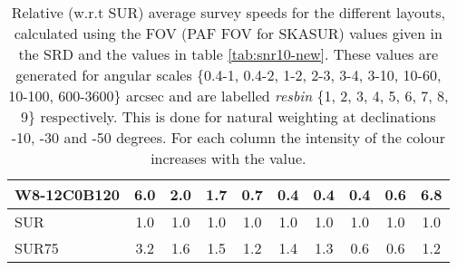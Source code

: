 \begin{table}[!htp]
{{\begin{tabular}{|l|ccccccccc|}
W8-12C0B120 & 6.0 \cellcolor{blue!60.00} & 2.0 \cellcolor{red!60.00} & 1.7 \cellcolor{green!60.00} & 0.7 \cellcolor{orange!29.20} & 0.4 \cellcolor{purple!18.00} & 0.4 \cellcolor{blue!18.93} & 0.4 \cellcolor{red!20.47} & 0.6 \cellcolor{green!21.00} & 6.8 \cellcolor{orange!58.31}\\ \hline 
SUR & 1.0 \cellcolor{blue!18.00} & 1.0 \cellcolor{red!18.00} & 1.0 \cellcolor{green!27.13} & 1.0 \cellcolor{orange!47.40} & 1.0 \cellcolor{purple!44.25} & 1.0 \cellcolor{blue!46.00} & 1.0 \cellcolor{red!60.00} & 1.0 \cellcolor{green!60.00} & 1.0 \cellcolor{orange!18.00}\\ \hline 
SUR75 & 3.2 \cellcolor{blue!36.60} & 1.6 \cellcolor{red!44.25} & 1.5 \cellcolor{green!53.61} & 1.2 \cellcolor{orange!60.00} & 1.4 \cellcolor{purple!60.00} & 1.3 \cellcolor{blue!60.00} & 0.6 \cellcolor{red!35.29} & 0.6 \cellcolor{green!27.00} & 1.2 \cellcolor{orange!19.18}\tabularnewline \hline 
\end{tabular}}\hfill \\

\caption{Relative (w.r.t SUR) average survey speeds for the different layouts, calculated using the FOV (PAF FOV for SKASUR) values given in the SRD \cite{srd} and the values in table \ref{tab:snr10-new}. These values are generated for angular scales \{0.4-1, 0.4-2, 1-2, 2-3, 3-4, 3-10, 10-60, 10-100, 600-3600\} arcsec and are labelled {\it resbin} \{1, 2, 3, 4, 5, 6, 7, 8, 9\} respectively. This is done for natural weighting at declinations -10, -30 and -50 degrees. For each column the intensity of the colour increases with the value.}\label{tab:speed_avg-new}}
 \end{table}